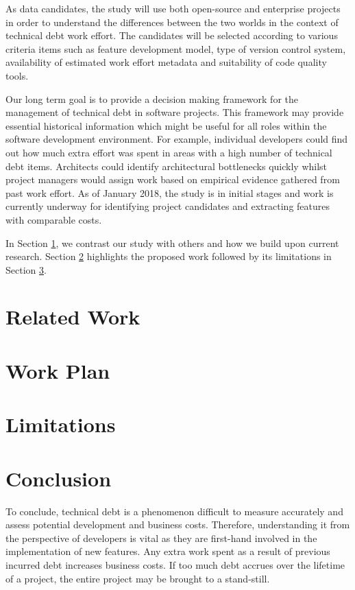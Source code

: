 As data candidates, the study will use both open-source and enterprise projects
in order to understand the differences between the two worlds in the context of
technical debt work effort. The candidates will be selected according to various
criteria items such as feature development model, type of version control
system, availability of estimated work effort metadata and suitability of code
quality tools. 

Our long term goal is to provide a decision making framework for the management of
technical debt in software projects. This framework may provide essential
historical information which might be useful for all roles within the software
development environment. For example, individual developers could find out how
much extra effort was spent in areas with a high number of technical debt items.
Architects could identify architectural bottlenecks quickly whilst project
managers would assign work based on empirical evidence gathered from past work
effort. As of January 2018, the study is in initial stages and work is currently
underway for identifying project candidates and extracting features with
comparable costs.

In Section \ref{related-work}, we contrast our study with others and how we
build upon current research. Section \ref{work-plan} highlights the proposed
work followed by its limitations in Section \ref{limitations}.  

\section{Related Work}
\label{related-work}

\section{Work Plan}
\label{work-plan}

\section{Limitations}
\label{limitations}

\section{Conclusion}
\label{conclusion}

To conclude, technical debt is a phenomenon difficult to measure accurately and
assess potential development and business costs. Therefore, understanding it
from the perspective of developers is vital as they are first-hand involved in
the implementation of new features. Any extra work spent as a result of previous
incurred debt increases business costs. If too much debt accrues over the
lifetime of a project, the entire project may be brought to a stand-still.

